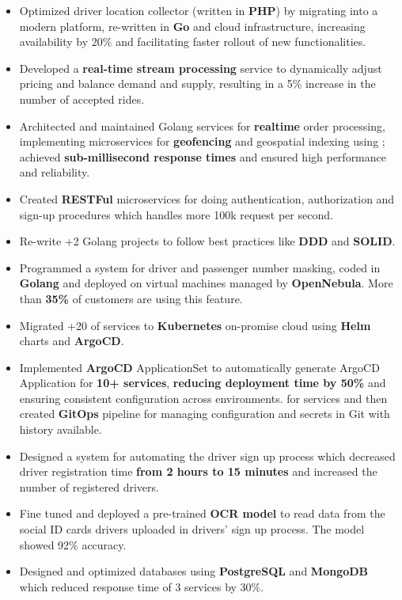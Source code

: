 \vspace{0.5cm}

\begin{itemize}
      \item Optimized driver location collector (written in \textbf{PHP}) by migrating into a modern platform, re-written in \textbf{Go} and cloud infrastructure,
            increasing availability by 20\% and facilitating faster rollout of new functionalities.
      \item Developed a \textbf{real-time stream processing} service to dynamically adjust pricing and balance demand and supply,
            resulting in a 5\% increase in the number of accepted rides.
      \item Architected and maintained Golang services for \textbf{realtime} order processing, implementing microservices for \textbf{geofencing} and geospatial indexing using ; achieved \textbf{sub-millisecond response times} and ensured high performance and reliability.
      \item Created \textbf{RESTFul} microservices for doing authentication, authorization and sign-up procedures which handles more 100k request per second.
      \item Re-write +2 Golang projects to follow best practices like \textbf{DDD} and \textbf{SOLID}.
      \item Programmed a system for driver and passenger number masking, coded in \textbf{Golang}
            and deployed on virtual machines managed by \textbf{OpenNebula}. More than \textbf{35\%} of customers are using this feature.
      \item Migrated +20 of services to \textbf{Kubernetes} on-promise cloud using \textbf{Helm} charts and \textbf{ArgoCD}.
      \item Implemented \textbf{ArgoCD} ApplicationSet to automatically generate ArgoCD Application for \textbf{10+ services}, \textbf{reducing deployment time by 50\%} and ensuring consistent configuration across environments.
            for services and then created \textbf{GitOps} pipeline for managing configuration
            and secrets in Git with history available.
      \item Designed a system for automating the driver sign up process which decreased driver registration time \textbf{from 2 hours to 15 minutes} and increased the number of registered drivers.
      \item Fine tuned and deployed a pre-trained \textbf{OCR model} to read data from the social ID cards drivers uploaded in drivers' sign up process. The model showed 92\% accuracy.
      \item Designed and optimized databases using \textbf{PostgreSQL} and \textbf{MongoDB} which reduced response time of 3 services by 30\%.
\end{itemize}

